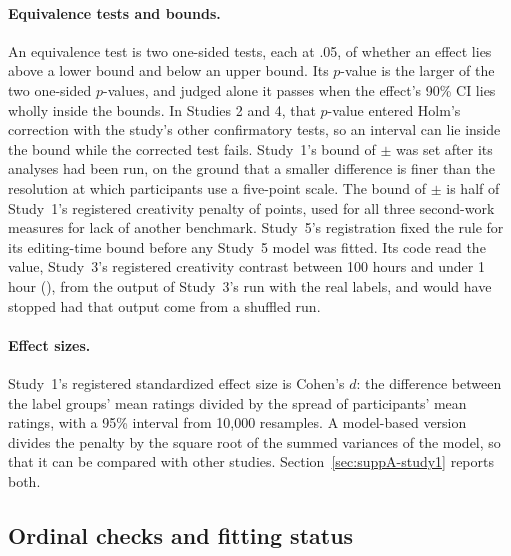 \paragraph*{Equivalence tests and bounds.}
An equivalence test is two one-sided tests, each at .05, of whether an effect lies above a lower bound and below an upper bound.\cite{schuirmann1987comparison,lakens2017equivalence} Its $p$-value is the larger of the two one-sided $p$-values, and judged alone it passes when the effect's 90\% CI lies wholly inside the bounds. In Studies 2 and 4, that $p$-value entered Holm's correction with the study's other confirmatory tests, so an interval can lie inside the bound while the corrected test fails. Study~1's bound of $\pm$\SOneHThreeBound{} was set after its analyses had been run, on the ground that a smaller difference is finer than the resolution at which participants use a five-point scale. The bound of $\pm$\SourceBound{} is half of Study~1's registered creativity penalty of \SOneHOneCreatDiffPrecise{} points, used for all three second-work measures for lack of another benchmark. Study~5's registration fixed the rule for its editing-time bound before any Study~5 model was fitted. Its code read the value, Study~3's registered creativity contrast between 100 hours and under 1 hour (\SThreeTimeContrastPrecise), from the output of Study~3's run with the real labels, and would have stopped had that output come from a shuffled run.

\paragraph*{Effect sizes.}
Study~1's registered standardized effect size is Cohen's $d$: the difference between the label groups' mean ratings divided by the spread of participants' mean ratings, with a 95\% interval from 10,000 resamples. A model-based version divides the penalty by the square root of the summed variances of the model, so that it can be compared with other studies. Section~\ref{sec:suppA-study1} reports both.

\subsection*{Ordinal checks and fitting status}

